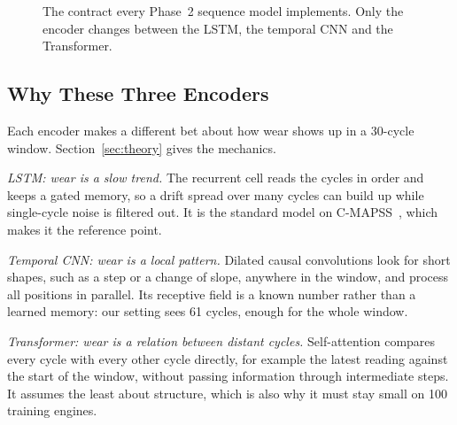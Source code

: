 \begin{figure}[t]
\centering
{}
\caption{The contract every Phase~2 sequence model implements. Only the
encoder changes between the LSTM, the temporal CNN and the Transformer.}
\label{fig:contract}
\end{figure}

\subsection{Why These Three Encoders}
Each encoder makes a different bet about how wear shows up in a 30-cycle
window. Section~\ref{sec:theory} gives the mechanics.

\emph{LSTM: wear is a slow trend.} The recurrent cell reads the cycles in
order and keeps a gated memory, so a drift spread over many cycles can build
up while single-cycle noise is filtered out. It is the standard model on
C-MAPSS~\cite{Zheng2017long,Chen2021machine}, which makes it the reference
point.

\emph{Temporal CNN: wear is a local pattern.} Dilated causal convolutions
look for short shapes, such as a step or a change of slope, anywhere in the
window, and process all positions in parallel. Its receptive field is a known
number rather than a learned memory: our setting sees 61 cycles, enough for
the whole window.

\emph{Transformer: wear is a relation between distant cycles.}
Self-attention compares every cycle with every other cycle directly, for
example the latest reading against the start of the window, without passing
information through intermediate steps. It assumes the least about structure,
which is also why it must stay small on 100 training engines.

